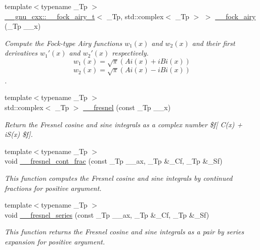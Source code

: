 \begin{DoxyCompactItemize}
{\footnotesize template$<$typename \+\_\+\+Tp $>$ }\\\hyperlink{struct____gnu__cxx_1_1____fock__airy__t}{\+\_\+\+\_\+gnu\+\_\+cxx\+::\+\_\+\+\_\+fock\+\_\+airy\+\_\+t}$<$ \+\_\+\+Tp, std\+::complex$<$ \+\_\+\+Tp $>$ $>$ \hyperlink{namespacestd_1_1____detail_a482936d128727bf73a5953639fd3a7e0}{\+\_\+\+\_\+fock\+\_\+airy} (\+\_\+\+Tp \+\_\+\+\_\+x)
\begin{DoxyCompactList}\small\item\em Compute the Fock-\/type Airy functions $ w_1(x) $ and $ w_2(x) $ and their first derivatives $ w_1'(x) $ and $ w_2'(x) $ respectively. \[ w_1(x) = \sqrt{\pi}(Ai(x) + iBi(x)) \] \[ w_2(x) = \sqrt{\pi}(Ai(x) - iBi(x)) \]. \end{DoxyCompactList}\item 
{\footnotesize template$<$typename \+\_\+\+Tp $>$ }\\std\+::complex$<$ \+\_\+\+Tp $>$ \hyperlink{namespacestd_1_1____detail_a322045015cfbde5a45e7718d533de60d}{\+\_\+\+\_\+fresnel} (const \+\_\+\+Tp \+\_\+\+\_\+x)
\begin{DoxyCompactList}\small\item\em Return the Fresnel cosine and sine integrals as a complex number \$f\mbox{[} C(x) + i\+S(x) \$f\mbox{]}. \end{DoxyCompactList}\item 
{\footnotesize template$<$typename \+\_\+\+Tp $>$ }\\void \hyperlink{namespacestd_1_1____detail_aeae8420e2fa1671f004066525adc99b6}{\+\_\+\+\_\+fresnel\+\_\+cont\+\_\+frac} (const \+\_\+\+Tp \+\_\+\+\_\+ax, \+\_\+\+Tp \&\+\_\+\+Cf, \+\_\+\+Tp \&\+\_\+\+Sf)
\begin{DoxyCompactList}\small\item\em This function computes the Fresnel cosine and sine integrals by continued fractions for positive argument. \end{DoxyCompactList}\item 
{\footnotesize template$<$typename \+\_\+\+Tp $>$ }\\void \hyperlink{namespacestd_1_1____detail_aae7775bc46d621e54fb9d994c2f35e2a}{\+\_\+\+\_\+fresnel\+\_\+series} (const \+\_\+\+Tp \+\_\+\+\_\+ax, \+\_\+\+Tp \&\+\_\+\+Cf, \+\_\+\+Tp \&\+\_\+\+Sf)
\begin{DoxyCompactList}\small\item\em This function returns the Fresnel cosine and sine integrals as a pair by series expansion for positive argument. \end{DoxyCompactList}\item 

\end{DoxyCompactItemize}
